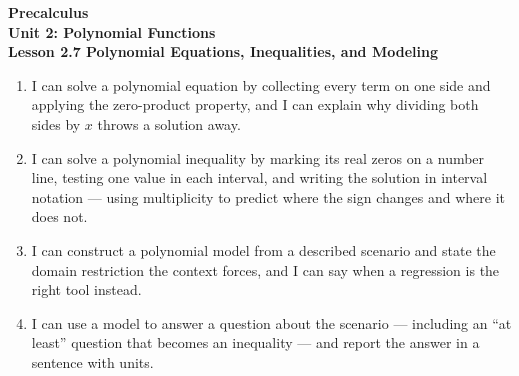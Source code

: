 \documentclass[10pt]{article}
\begin{document}
\vspace{-0.8in}

\begin{center}
  {\color{white}\textbf{\LARGE Precalculus}}\\[4pt]
  {\color{lilacmid}\large\textbf{Unit 2: Polynomial Functions}}\\[6pt]
  {\color{white}\textbf{\large Lesson 2.7 \quad Polynomial Equations, Inequalities, and Modeling}}
\end{center}

\vspace{0.22in}
\namedateperiod
\vspace{0.18in}

\begin{learningtargetbox}
\small
\begin{enumerate}[leftmargin=1.5em, itemsep=5pt]
  \item I can solve a polynomial equation by collecting every term on one side
        and applying the zero-product property, and I can explain why dividing
        both sides by $x$ throws a solution away.
  \item I can solve a polynomial inequality by marking its real zeros on a
        number line, testing one value in each interval, and writing the
        solution in interval notation --- using multiplicity to predict where
        the sign changes and where it does not.
  \item I can construct a polynomial model from a described scenario and state
        the domain restriction the context forces, and I can say when a
        regression is the right tool instead.
  \item I can use a model to answer a question about the scenario --- including
        an ``at least'' question that becomes an inequality --- and report the
        answer in a sentence with units.
\end{enumerate}
\end{learningtargetbox}

\vspace{0.14in}
\end{document}
